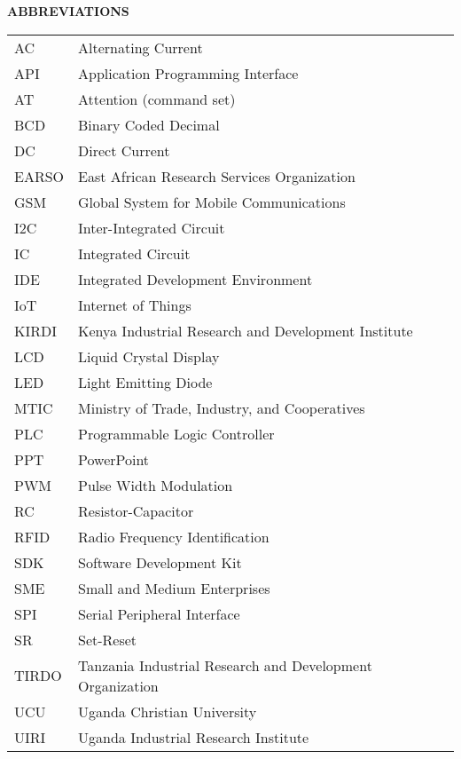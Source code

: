 \documentclass[12pt,a4paper]{report}
\begin{document}
\newpage
\tableofcontents
\vspace{40pt}

\listoffigures
\vspace{-10pt}

\newpage

{\fontsize{14}{16.8}\selectfont\bfseries\centering ABBREVIATIONS\par}
\vspace{10pt}

\begin{tabular}{ll}
AC & Alternating Current \\
API & Application Programming Interface \\
AT & Attention (command set) \\
BCD & Binary Coded Decimal \\
DC & Direct Current \\
EARSO & East African Research Services Organization \\
GSM & Global System for Mobile Communications \\
I2C & Inter-Integrated Circuit \\
IC & Integrated Circuit \\
IDE & Integrated Development Environment \\
IoT & Internet of Things \\
KIRDI & Kenya Industrial Research and Development Institute \\
LCD & Liquid Crystal Display \\
LED & Light Emitting Diode \\
MTIC & Ministry of Trade, Industry, and Cooperatives \\
PLC & Programmable Logic Controller \\
PPT & PowerPoint \\
PWM & Pulse Width Modulation \\
RC & Resistor-Capacitor \\
RFID & Radio Frequency Identification \\
SDK & Software Development Kit \\
SME & Small and Medium Enterprises \\
SPI & Serial Peripheral Interface \\
SR & Set-Reset \\
TIRDO & Tanzania Industrial Research and Development Organization \\
UCU & Uganda Christian University \\
UIRI & Uganda Industrial Research Institute \\
\end{tabular}
\end{document}
